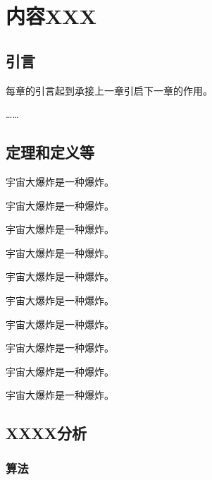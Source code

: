 
\chapter{内容XXX}

\section{引言}

每章的引言起到承接上一章引启下一章的作用。

\ldots\ldots

\section{定理和定义等}

\begin{theorem}
宇宙大爆炸是一种爆炸。
\end{theorem}
\begin{definition}[（霍金）]
宇宙大爆炸是一种爆炸。
\end{definition}
\begin{assumption}
宇宙大爆炸是一种爆炸。
\end{assumption}
\begin{lemma}
宇宙大爆炸是一种爆炸。
\end{lemma}
\begin{corollary}
宇宙大爆炸是一种爆炸。
\end{corollary}
\begin{exercise}
宇宙大爆炸是一种爆炸。
\end{exercise}
\begin{problem}
宇宙大爆炸是一种爆炸。
\end{problem}
\begin{remark}
宇宙大爆炸是一种爆炸。
\end{remark}
\begin{axiom}[（爱因斯坦）]
宇宙大爆炸是一种爆炸。
\end{axiom}
\begin{conjecture}
宇宙大爆炸是一种爆炸。
\end{conjecture}

\section{XXXX分析}

\subsection{算法}

